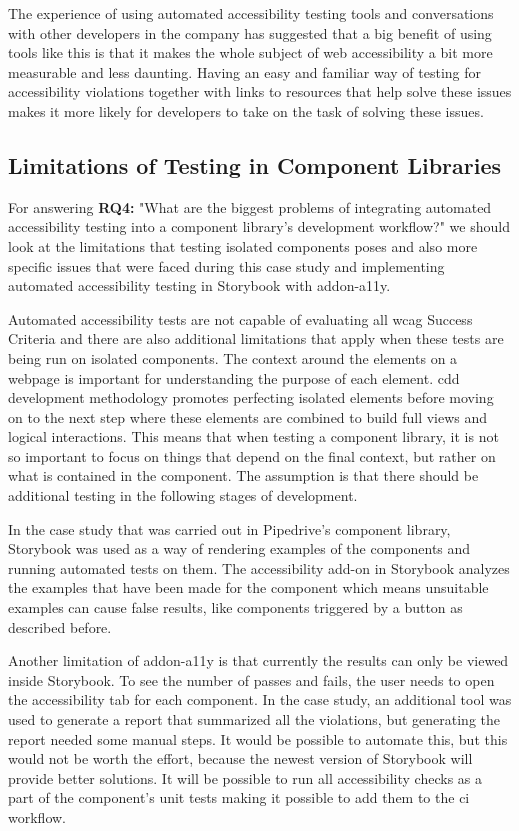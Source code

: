 \documentclass{master_thesis}
\begin{document}
The experience of using automated accessibility testing tools and conversations with other developers in the company has suggested that a big benefit of using tools like this is that it makes the whole subject of web accessibility a bit more measurable and less daunting. Having an easy and familiar way of testing for accessibility violations together with links to resources that help solve these issues makes it more likely for developers to take on the task of solving these issues.

\subsection{Limitations of Testing in Component Libraries}

For answering \textbf{RQ4:} "What are the biggest problems of integrating automated accessibility testing into a component library's development workflow?" we should look at the limitations that testing isolated components poses and also more specific issues that were faced during this case study and implementing automated accessibility testing in Storybook with addon-a11y.

Automated accessibility tests are not capable of evaluating all \ac{wcag} Success Criteria and there are also additional limitations that apply when these tests are being run on isolated components. The context around the elements on a webpage is important for understanding the purpose of each element. \ac{cdd} development methodology promotes perfecting isolated elements before moving on to the next step where these elements are combined to build full views and logical interactions. This means that when testing a component library, it is not so important to focus on things that depend on the final context, but rather on what is contained in the component. The assumption is that there should be additional testing in the following stages of development.

In the case study that was carried out in Pipedrive's component library, Storybook was used as a way of rendering examples of the components and running automated tests on them. The accessibility add-on in Storybook analyzes the examples that have been made for the component which means unsuitable examples can cause false results, like components triggered by a button as described before.

Another limitation of addon-a11y is that currently the results can only be viewed inside Storybook. To see the number of passes and fails, the user needs to open the accessibility tab for each component. In the case study, an additional tool was used to generate a report that summarized all the violations, but generating the report needed some manual steps. It would be possible to automate this, but this would not be worth the effort, because the newest version of Storybook will provide better solutions. It will be possible to run all accessibility checks as a part of the component's unit tests making it possible to add them to the \ac{ci} workflow.
\end{document}

